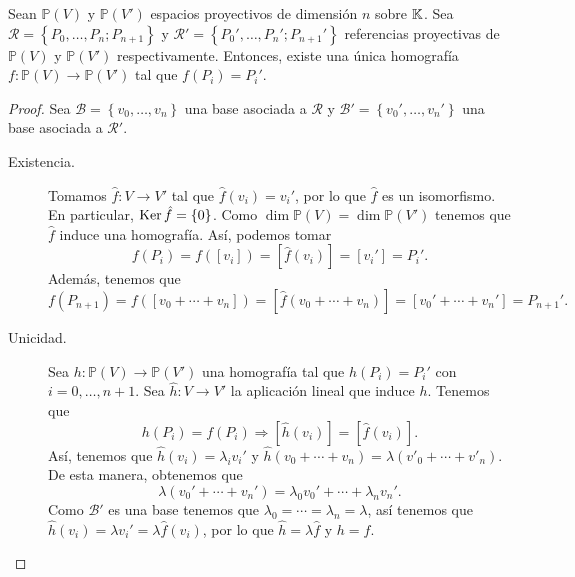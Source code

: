 \begin{prop}
	Sean $\displaystyle \mathbb{P}\left(V\right) $ y $\displaystyle \mathbb{P}\left(V'\right) $ espacios proyectivos de dimensión $\displaystyle n $ sobre $\displaystyle \mathbb{K} $. Sea $\displaystyle \mathcal{R} = \left\{ P_{0}, \ldots, P_{n}; P_{n+1}\right\}  $ y $\displaystyle \mathcal{R}' = \left\{ P_{0}', \ldots, P_{n}'; P_{n+1}'\right\}  $ referencias proyectivas de $\displaystyle \mathbb{P}\left(V\right) $ y $\displaystyle \mathbb{P}\left(V'\right) $ respectivamente. 
Entonces, existe una única homografía $\displaystyle f : \mathbb{P}\left(V\right) \to \mathbb{P}\left(V'\right) $ tal que $\displaystyle f\left(P_{i}\right) = P_{i}' $. 
\end{prop}
\begin{proof}
	Sea $\displaystyle \mathcal{B} = \left\{ v_{0}, \ldots, v_{n}\right\}  $ una base asociada a $\displaystyle \mathcal{R} $ y $\displaystyle \mathcal{B}' = \left\{ v_{0}', \ldots, v_{n}'\right\} $ una base asociada a $\displaystyle \mathcal{R}' $.
	\begin{description}
	\item[Existencia.] Tomamos $\displaystyle \hat{f} : V \to V' $ tal que $\displaystyle \hat{f}\left(v_{i}\right) = v_{i}' $, por lo que $\displaystyle \hat{f} $ es un isomorfismo. 
	En particular, $\displaystyle \operatorname{Ker}\hat{f} = \left\{ 0\right\}  $. Como $\displaystyle \dim\mathbb{P}\left(V\right) = \dim\mathbb{P}\left(V'\right) $ tenemos que $\displaystyle \hat{f} $ induce una homografía. Así, podemos tomar
	\[f\left(P_{i}\right) = f\left([v_{i}]\right) = [\hat{f}\left(v_{i}\right)] = [v_{i}'] = P_{i}' .\]
Además, tenemos que 
\[f\left(P_{n+1}\right) = f\left([v_{0} + \cdots + v_{n}]\right) = [\hat{f}\left(v_{0}+ \cdots + v_{n}\right)] = [v_{0}'+\cdots +v_{n}'] = P_{n+1}' .\]
\item[Unicidad.] Sea $\displaystyle h : \mathbb{P}\left(V\right) \to \mathbb{P}\left(V'\right) $ una homografía tal que $\displaystyle h\left(P_{i}\right) = P_{i}' $ con $\displaystyle i = 0, \ldots, n+ 1 $. Sea $\displaystyle \hat{h} : V \to V'$ la aplicación lineal que induce $\displaystyle h $. 
Tenemos que 
\[h\left(P_{i}\right) = f\left(P_{i}\right) \Rightarrow [\hat{h}\left(v_{i}\right)] = [\hat{f}\left(v_{i}\right)] .\]
Así, tenemos que $\displaystyle \hat{h}\left(v_{i}\right) = \lambda_{i}v_{i}' $ y $\displaystyle \hat{h} \left(v_{0} + \cdots + v_{n}\right) = \lambda\left(v'_{0} + \cdots + v'_{n}\right) $. De esta manera, obtenemos que
\[\lambda\left(v_{0}' + \cdots + v_{n}'\right) = \lambda_{0}v_{0}' + \cdots + \lambda_{n}v_{n}' .\]
Como $\displaystyle \mathcal{B}' $ es una base tenemos que $\displaystyle \lambda_{0} = \cdots = \lambda_{n} = \lambda  $, así tenemos que $\displaystyle \hat{h}\left(v_{i}\right) = \lambda v_{i}' = \lambda \hat{f}\left(v_{i}\right) $, por lo que $\displaystyle \hat{h} = \lambda \hat{f} $ y $\displaystyle h = f $.
	\end{description}
\end{proof}
